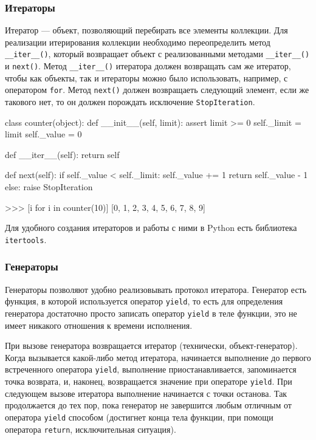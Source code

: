 \subsubsection{Итераторы}
Итератор --- объект, позволяющий перебирать все элементы коллекции. Для реализации итерирования коллекции необходимо переопределить метод \lstinline{__iter__()}, который возвращает объект с реализованными методами \lstinline{__iter__()} и \lstinline{next()}. Метод \lstinline{__iter__()} итератора должен возвращать сам же итератор, чтобы как объекты, так и итераторы можно было использовать, например, с оператором \lstinline{for}. Метод \lstinline{next()} должен возвращаеть следующий элемент, если же такового нет, то он должен порождать исключение \lstinline{StopIteration}.
\begin{pylst}{}{}
class counter(object):
    def __init__(self, limit):
        assert limit >= 0
        self._limit = limit
        self._value = 0

    def __iter__(self):
        return self

    def next(self):
        if self._value < self._limit:
            self._value += 1
            return self._value - 1
        else:
            raise StopIteration

>>> [i for i in counter(10)]
[0, 1, 2, 3, 4, 5, 6, 7, 8, 9]
\end{pylst}

Для удобного создания итераторов и работы с ними в Python есть библиотека \texttt{itertools}.

\subsubsection{Генераторы}
Генераторы позволяют удобно реализовывать протокол итератора. Генератор есть функция, в которой используется оператор \lstinline{yield}, то есть для определения генератора достаточно просто записать оператор \lstinline{yield} в теле функции, это не имеет никакого отношения к времени исполнения.

При вызове генератора возвращается итератор (технически, объект-генератор). Когда вызывается какой-либо метод итератора, начинается выполнение до первого встреченного оператора \lstinline{yield}, выполнение приостанавливается, запоминается точка возврата, и, наконец, возвращается значение при операторе \lstinline{yield}. При следующем вызове итератора выполнение начинается с точки останова. Так продолжается до тех пор, пока генератор не завершится любым отличным от оператора \lstinline{yield} способом (достигнет конца тела функции, при помощи оператора \lstinline{return}, исключительная ситуация).

